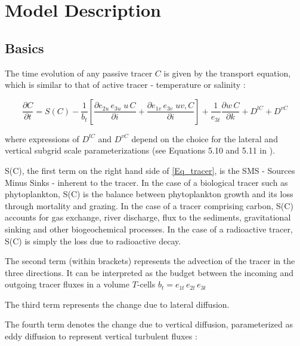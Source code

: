 \documentclass[../main/TOP_manual]{subfiles}
\begin{document}
\newcommand{\cd}{\mathrm{CO_2}}
\newcommand{\Ct}{\mathrm{C_T}}
\newcommand{\pacd}{\mathrm{p^a_{CO_2}}}
\newcommand{\cq}{\mathrm{^{14}C}}
\newcommand{\Dcq}{\Delta ^{14}\mathrm{C}}
\newcommand{\Rq}{\mathrm{^{14}{R}}}

\chapter{Model Description}
\label{chap:ModDes}
\chaptertoc

\section{Basics}
\label{sec:Bas}

The time evolution of any passive tracer $C$ is given by the transport equation, which is similar to that of active tracer - temperature or salinity :

\begin{equation}
\frac{\partial C}{\partial t} = {S(C)} -  \frac{1}{b_t} \left[   \frac{\partial e_{2u}\,e_{3u} \;  u\, C}{\partial i} +   \frac{\partial e_{1v}\,e_{3v} \;  uv, C}{\partial i}  \right] + \frac{1}{e_{3t}} \frac{\partial w\, C}{\partial k} + D^{lC} + D^{vC}
\label{Eq_tracer}
\end{equation}

where expressions of $D^{lC}$ and $D^{vC}$ depend on the choice for the lateral and vertical subgrid scale parameterizations (see Equations 5.10 and 5.11 in \cite{nemo_manual}).

{S(C)}, the first term on the right hand side of \autoref{Eq_tracer}, is the SMS - Sources Minus Sinks - inherent to the tracer.
In the case of a biological tracer such as phytoplankton, {S(C)} is the balance between phytoplankton growth and its loss through mortality and grazing.
In the case of a tracer comprising carbon,  {S(C)} accounts for gas exchange, river discharge, flux to the sediments, gravitational sinking and other biogeochemical processes.
In the case of a radioactive tracer, {S(C)} is simply the loss due to radioactive decay.

The second term (within brackets) represents the advection of the tracer in the three directions.
It can be interpreted as the budget between the incoming and outgoing tracer fluxes in a volume $T$-cells $b_t= e_{1t}\,e_{2t}\,e_{3t}$

The third term  represents the change due to lateral diffusion.

The fourth term denotes the change due to vertical diffusion, parameterized as eddy diffusion to represent vertical turbulent fluxes :
\end{document}
